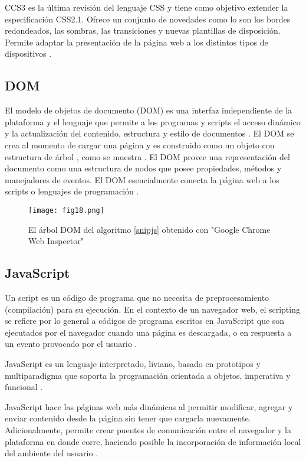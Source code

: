 CCS3 es la última revisión del lenguaje CSS y tiene como objetivo extender la especificación CSS2.1. Ofrece un conjunto de novedades como lo son los bordes redondeados, las sombras, las transiciones y nuevas plantillas de disposición. Permite adaptar la presentación de la página web a los distintos tipos de dispositivos \cite{MozCSS3}.

\subsection{DOM}

El modelo de objetos de documento (DOM) es una interfaz independiente de la plataforma y el lenguaje que permite a los programas y scripts el acceso dinámico y la actualización del contenido, estructura y estilo de documentos \cite{Rob98}. El DOM se crea al momento de cargar una página y es construido como un objeto con estructura de árbol \cite{JsHD}, como se muestra . El DOM provee una representación del documento como una estructura de nodos que posee propiedades, métodos y manejadores de eventos. El DOM esencialmente conecta la página web a los scripts o lenguajes de programación \cite{MozDOM}.

\begin{figure}[htp]
  \centering
  \texttt{[image: fig18.png]}
  \caption[Modelo de objetos de documento (DOM)]{El árbol DOM del algoritmo \ref{snipjs} obtenido con "Google Chrome Web Inspector"}
  \label{fig:fig18}
\end{figure}

\subsection{JavaScript}

Un script es un código de programa que no necesita de preprocesamiento (compilación) para su ejecución. En el contexto de un navegador web, el scripting se refiere por lo general a códigos de programa escritos en JavaScript que son ejecutados por el navegador cuando una página es descargada, o en respuesta a un evento provocado por el usuario \cite{Js13}.

JavaScript es un lenguaje interpretado, liviano, basado en prototipos y multiparadigma que soporta la programación orientada a objetos, imperativa y funcional \cite{MozJS}.

JavaScript hace las páginas web más dinámicas al permitir modificar, agregar y enviar contenido desde la página sin tener que cargarla nuevamente. Adicionalmente, permite crear puentes de comunicación entre el navegador y la plataforma en donde corre, haciendo posible la incorporación de información local del ambiente del usuario \cite{Js13}.

